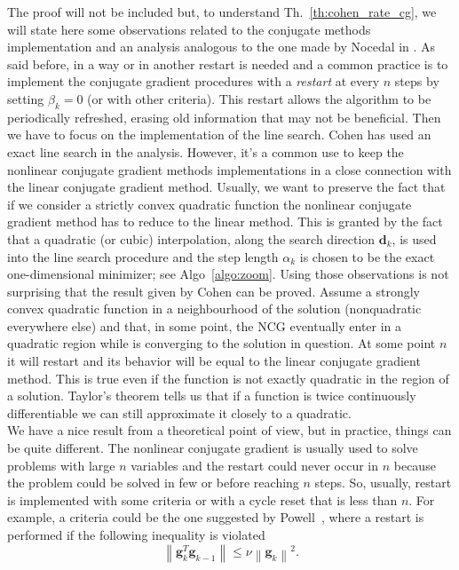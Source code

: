 \documentclass[11pt]{article}
\newcommand{\norm}[1]{\left\lVert#1\right\rVert}
\begin{document}
The proof will not be included but, to understand Th.~\ref{th:cohen_rate_cg}, we will state here some observations related to the conjugate methods implementation and an analysis analogous to the one made by Nocedal in \cite{Nocedal} . As said before, in a way or in another restart is needed and a common practice is to implement the conjugate gradient procedures with a \emph{restart} at every $n$ steps by setting $\beta_k = 0$ (or with other criteria). This restart allows the algorithm to be periodically refreshed, erasing old information that may not be beneficial. Then we have to focus on the implementation of the line search. Cohen has used an exact line search in the analysis. However, it's a common use to keep the nonlinear conjugate gradient methods implementations in a close connection with the linear conjugate gradient method. Usually, we want to preserve the fact that if we consider a strictly convex quadratic function the nonlinear conjugate gradient method has to reduce to the linear method. This is granted by the fact that a quadratic (or cubic) interpolation, along the search direction $\mathbf{d}_k$, is used into the line search procedure and the step length $\alpha_k$ is chosen to be the exact one-dimensional minimizer; see Algo~\ref{algo:zoom}. Using those observations is not surprising that the result given by Cohen can be proved. Assume a strongly convex quadratic function in a neighbourhood of the solution (nonquadratic everywhere else) and that, in some point, the NCG eventually enter in a quadratic region while is converging to the solution in question. At some point $n$ it will restart and its behavior will be equal to the linear conjugate gradient method. This is true even if the function is not exactly quadratic in the region of a solution. Taylor’s theorem tells us that if a function is twice continuously differentiable we can still approximate it closely to a quadratic.\\

We have a nice result from a theoretical point of view, but in practice, things can be quite different. The nonlinear conjugate gradient is usually used to solve problems with large $n$ variables and the restart could never occur in $n$ because the problem could be solved in few or before reaching $n$ steps. So, usually, restart is implemented with some criteria or with a cycle reset that is less than $n$. For example, a criteria could be the one suggested by Powell~\cite{Powell1977}, where a restart is performed if the following inequality is violated
\begin{equation}
    \norm{\mathbf{g}_{k}^T \mathbf{g}_{k-1}} \leq \nu \norm{\mathbf{g}_k}^2.
\end{equation}
\end{document}
